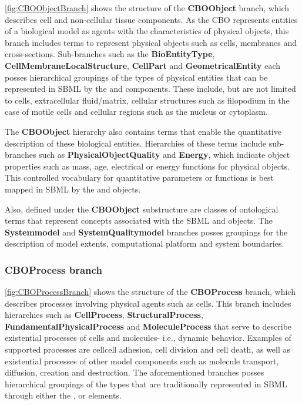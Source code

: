 \ref{fig:CBOObjectBranch} shows the structure of the \textbf{CBO\textunderscore Object} branch, which describes cell and non-cellular tissue components. As the CBO represents entities of a biological model as agents with the characteristics of physical objects, this branch includes terms to represent physical objects such as cells, membranes and cross-sections. Sub-branches such as the \textbf{BioEntityType}, \textbf{CellMembraneLocalStructure}, \textbf{CellPart} and \textbf{GeometricalEntity} each posses hierarchical groupings of the types of physical entities that can be represented in SBML by the \Compartment and \Species components. These include, but are not limited to cells, extracellular fluid/matrix, cellular structures such as filopodium in the case of motile cells and cellular regions such as the nucleus or cytoplasm.

The \textbf{CBO\textunderscore Object} hierarchy also contains terms that enable the quantitative description of these biological entities. Hierarchies of these terms include sub-branches such as \textbf{PhysicalObjectQuality} and \textbf{Energy}, which indicate object properties such as mass, age, electrical or energy functions for physical objects. This controlled vocabulary for quantitative parameters or functions is best mapped in SBML by the \Parameter and \FunctionDefinition objects. 

Also, defined under the \textbf{CBO\textunderscore Object} substructure are classes of ontological terms that represent concepts associated with the SBML \Parameter and \Model objects. The \textbf{System\textemdash model} and \textbf{SystemQuality\textemdash model} branches posses groupings for the description of model extents, computational platform and system boundaries.

\subsubsection{CBO\textunderscore Process branch}
\label{subsubsec:CBOProcessBranch}

\ref{fig:CBOProcessBranch} shows the structure of the \textbf{CBO\textunderscore Process} branch, which describes processes involving physical agents such as cells. This branch includes hierarchies such as \textbf{CellProcess}, \textbf{StructuralProcess}, \textbf{FundamentalPhysicalProcess} and \textbf{MoleculeProcess} that serve to describe existential processes of cells and molecules- i.e., dynamic behavior. Examples of supported processes are cell\textendash cell adhesion, cell division and cell death, as well as existential processes of other model components such as molecule transport, diffusion, creation and destruction. The aforementioned branches posses hierarchical groupings of the types that are traditionally represented in SBML through either the \Reaction, \Rule or \Event elements. 

